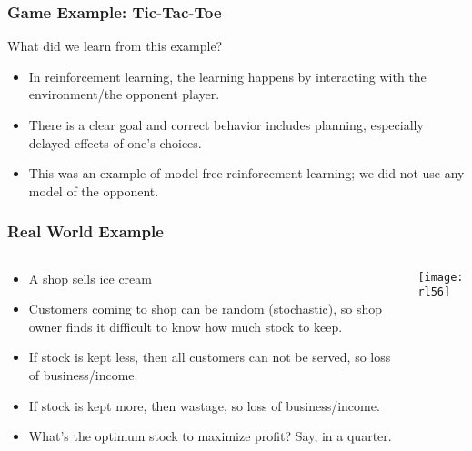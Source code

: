 \begin{frame}[fragile]\frametitle{Game Example: Tic-Tac-Toe}
What did we learn from this example?

\begin{itemize}
\item In reinforcement learning, the learning happens by interacting with the environment/the opponent player.
\item There is a clear goal and correct behavior includes planning, especially delayed effects of one's choices.
\item This was an example of model-free reinforcement learning; we did not use any model of the opponent.
\end{itemize}

\end{frame}

\begin{frame}[fragile]\frametitle{Real World Example}

\begin{columns}
\begin{column}{0.5\textwidth}

\begin{itemize}
\item A shop sells ice cream
\item Customers coming to shop can be random (stochastic), so shop owner finds it difficult to know how much stock to keep.
\item If stock is kept less, then all customers can not be served, so loss of business/income.
\item If stock is kept more, then wastage, so loss of business/income.
\item What's the optimum stock to maximize profit? Say, in a quarter.
\end{itemize}

\end{column}
\begin{column}{0.5\textwidth}  %


\begin{center}
\texttt{[image: rl56]}
\end{center}
\end{column}
\end{columns}

\end{frame}


